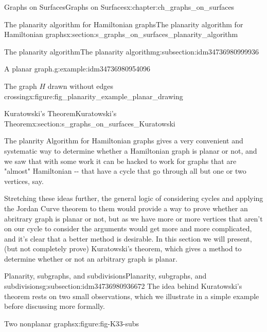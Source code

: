 \documentclass[oneside,10pt,]{book}
\numberwithin{equation}{section}
\begin{document}
\begin{chapterptx}{Graphs on Surfaces}{}{Graphs on Surfaces}{}{}{x:chapter:ch_graphs_on_surfaces}
\begin{sectionptx}{The planarity algorithm for Hamiltonian graphs}{}{The planarity algorithm for Hamiltonian graphs}{}{}{x:section:s_graphs_on_surfaces_planarity_algorithm}
\begin{subsectionptx}{The planarity algorithm}{}{The planarity algorithm}{}{}{g:subsection:idm34736980999936}
\begin{example}{A planar graph.}{g:example:idm34736980954096}
\begin{figureptx}{The graph \(H\) drawn without edges crossing}{x:figure:fig_planarity_example_planar_drawing}{}
\begin{image}{0.15}{0.7}{0.15}
{\begin{tikzpicture}[scale=.7]
\end{tikzpicture}
}%
\end{image}%
\tcblower
\end{figureptx}%
\end{example}
\end{subsectionptx}
\end{sectionptx}
%
%
\typeout{************************************************}
\typeout{************************************************}
%
\begin{sectionptx}{Kuratowski's Theorem}{}{Kuratowski's Theorem}{}{}{x:section:s_graphs_on_surfaces_Kuratowski}
\begin{introduction}{}%
The planrity Algorithm for Hamiltonian graphs gives a very convenient and systematic way to determine whether a Hamiltonian graph is planar or not, and we saw that with some work it can be hacked to work for graphs that are "almost" Hamiltonian -{}-{} that have a cycle that go through all but one or two vertices, say.%
\par
Stretching these ideas further, the general logic of considering cycles and applying the Jordan Curve theorem to them would provide a way to prove whether an abritrary graph is planar or not, but as we have more or more vertices that aren't on our cycle to consider the arguments would get more and more complicated, and it's clear that a better method is desirable.  In this section we will present, (but not completely prove) Kuratowski's theorem, which gives a method to determine whether or not an arbitrary graph is planar.%
\end{introduction}%
%
%
\typeout{************************************************}
\typeout{************************************************}
%
\begin{subsectionptx}{Planarity, subgraphs, and subdivisions}{}{Planarity, subgraphs, and subdivisions}{}{}{g:subsection:idm34736980936672}
The idea behind Kuratowski's theorem rests on two small observations, which we illustrate in a simple example before discussing more formally.%
\begin{figureptx}{Two nonplanar graphs}{x:figure:fig-K33-subs}{}%
\begin{image}{0.05}{0.9}{0.05}%
\end{image}
\end{figureptx}
\end{subsectionptx}
\end{sectionptx}
\end{chapterptx}
\end{document}
